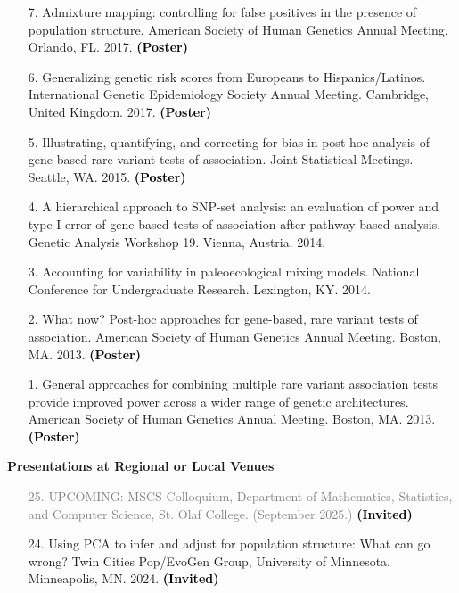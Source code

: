 \documentclass[margin]{res}
\newcommand{\annotate}[1]{\textcolor{black}{\textbf{(#1)}}}
\begin{document}
\begin{resume}
\begin{itemize}
\item[7.] Admixture mapping: controlling for false positives in the presence of population structure. 
American Society of Human Genetics Annual Meeting. Orlando, FL. 2017. 
\annotate{Poster}

\item[6.] Generalizing genetic risk scores from Europeans to Hispanics/Latinos. 
International Genetic Epidemiology Society Annual Meeting. Cambridge, United Kingdom. 2017. 
\annotate{Poster}

\item[5.] Illustrating, quantifying, and correcting for bias in post-hoc analysis of gene-based rare variant tests of association. 
Joint Statistical Meetings. Seattle, WA. 2015.
\annotate{Poster}

\item[4.] A hierarchical approach to SNP-set analysis: an evaluation of power and type I error of gene-based tests of association after pathway-based analysis. 
Genetic Analysis Workshop 19. Vienna, Austria. 2014.

\item[3.] Accounting for variability in paleoecological mixing models. 
National Conference for Undergraduate Research. Lexington, KY. 2014.

\item[2.] What now? Post-hoc approaches for gene-based, rare variant tests of association. 
American Society of Human Genetics Annual Meeting. Boston, MA. 2013. 
\annotate{Poster}

\item[1.] General approaches for combining multiple rare variant association tests provide improved power across a wider range of genetic architectures. 
American Society of Human Genetics Annual Meeting. Boston, MA. 2013. 
\annotate{Poster}

\end{itemize}





\textbf{Presentations at Regional or Local Venues} 

\begin{itemize}

\item[\textcolor{gray}{25.}] \textcolor{gray}{UPCOMING: 
MSCS Colloquium, Department of Mathematics, Statistics, and Computer Science, St. Olaf College. (September 2025.) 
\annotate{Invited}}

\item[24.] Using PCA to infer and adjust for population structure: What can go wrong? 
Twin Cities Pop/EvoGen Group, University of Minnesota. Minneapolis, MN. 2024. 
\annotate{Invited}


\end{itemize}
\end{resume}
\end{document}
